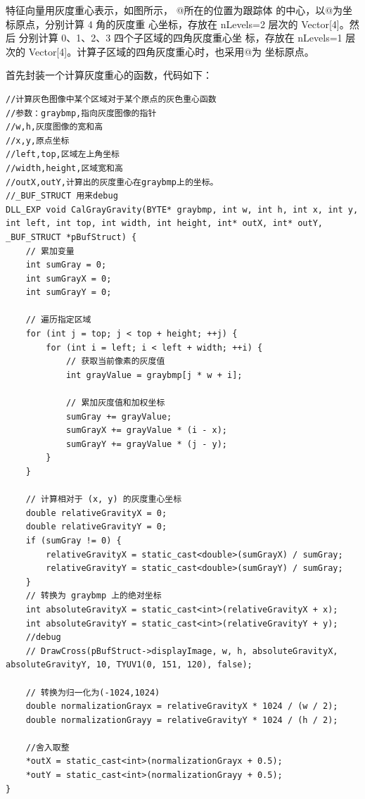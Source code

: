 \documentclass[12pt,hyperref,a4paper,UTF8]{ctexart}
\begin{document}
        特征向量用灰度重心表示，如图所示， @所在的位置为跟踪体
        的中心，以@为坐标原点，分别计算 4 角的灰度重
        心坐标，存放在 nLevels=2 层次的 Vector[4]。然后
        分别计算 0、1、2、3 四个子区域的四角灰度重心坐
        标，存放在 nLevels=1 层次的 Vector[4]。计算子区域的四角灰度重心时，也采用@为
        坐标原点。

        首先封装一个计算灰度重心的函数，代码如下：
        \begin{lstlisting}[caption={灰度重心计算函数}, label={lst:example}]
//计算灰色图像中某个区域对于某个原点的灰色重心函数
//参数：graybmp,指向灰度图像的指针
//w,h,灰度图像的宽和高
//x,y,原点坐标
//left,top,区域左上角坐标
//width,height,区域宽和高
//outX,outY,计算出的灰度重心在graybmp上的坐标。
//_BUF_STRUCT 用来debug
DLL_EXP void CalGrayGravity(BYTE* graybmp, int w, int h, int x, int y, int left, int top, int width, int height, int* outX, int* outY, _BUF_STRUCT *pBufStruct) {
    // 累加变量
    int sumGray = 0;
    int sumGrayX = 0;
    int sumGrayY = 0;

    // 遍历指定区域
    for (int j = top; j < top + height; ++j) {
        for (int i = left; i < left + width; ++i) {
            // 获取当前像素的灰度值
            int grayValue = graybmp[j * w + i];

            // 累加灰度值和加权坐标
            sumGray += grayValue;
            sumGrayX += grayValue * (i - x);
            sumGrayY += grayValue * (j - y);
        }
    }

    // 计算相对于 (x, y) 的灰度重心坐标
    double relativeGravityX = 0;
    double relativeGravityY = 0;
    if (sumGray != 0) {
        relativeGravityX = static_cast<double>(sumGrayX) / sumGray;
        relativeGravityY = static_cast<double>(sumGrayY) / sumGray;
    }
    // 转换为 graybmp 上的绝对坐标
    int absoluteGravityX = static_cast<int>(relativeGravityX + x);
    int absoluteGravityY = static_cast<int>(relativeGravityY + y);
    //debug
    // DrawCross(pBufStruct->displayImage, w, h, absoluteGravityX, absoluteGravityY, 10, TYUV1(0, 151, 120), false);

    // 转换为归一化为(-1024,1024)
    double normalizationGrayx = relativeGravityX * 1024 / (w / 2);
    double normalizationGrayy = relativeGravityY * 1024 / (h / 2);

    //舍入取整
    *outX = static_cast<int>(normalizationGrayx + 0.5);
    *outY = static_cast<int>(normalizationGrayy + 0.5);
}
        \end{lstlisting}
\end{document}

